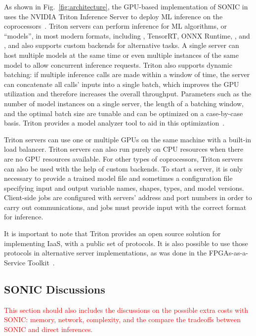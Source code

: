 As shown in Fig.~\ref{fig:architecture}, the GPU-based implementation of SONIC in \CMSSW uses the NVIDIA Triton Inference Server to deploy ML inference on the coprocessors~\cite{triton, triton_readme}. Triton servers can perform inference for ML algorithms, or ``models'', in most modern formats, including \PYTORCH, TensorRT, ONNX Runtime, \TENSORFLOW, and \XGBOOST, and also supports custom backends for alternative tasks. A single server can host multiple models at the same time or even multiple instances of the same model to allow concurrent inference requests. Triton also supports dynamic batching: if multiple inference calls are made within a window of time, the server can concatenate all calls' inputs into a single batch, which improves the GPU utilization and therefore increases the overall throughput. Parameters such as the number of model instances on a single server, the length of a batching window, and the optimal batch size are tunable and can be optimized on a case-by-case basis. Triton provides a model analyzer tool to aid in this optimization~\cite{triton_model_analyzer}.

Triton servers can use one or multiple GPUs on the same machine with a built-in load balancer. Triton servers can also run purely on CPU resources when there are no GPU resources available. For other types of coprocessors, Triton servers can also be used with the help of custom backends. To start a server, it is only necessary to provide a trained model file and sometimes a configuration file specifying input and output variable names, shapes, types, and model versions. Client-side jobs are configured with servers' address and port numbers in order to carry out communications, and jobs must provide input with the correct format for inference.

It is important to note that Triton provides an open source solution for implementing IaaS, with a public set of protocols. It is also possible to use those protocols in alternative server implementations, as was done in the FPGAs-as-a-Service Toolkit~\cite{FaaST}.%

\subsection{SONIC Discussions}
\label{sec:sonic_benefits}
\textcolor{red}{This section should also includes the discussions on the possible extra costs with SONIC: memory, network, complexity, and the compare the tradeoffs between SONIC and direct inferences.}

